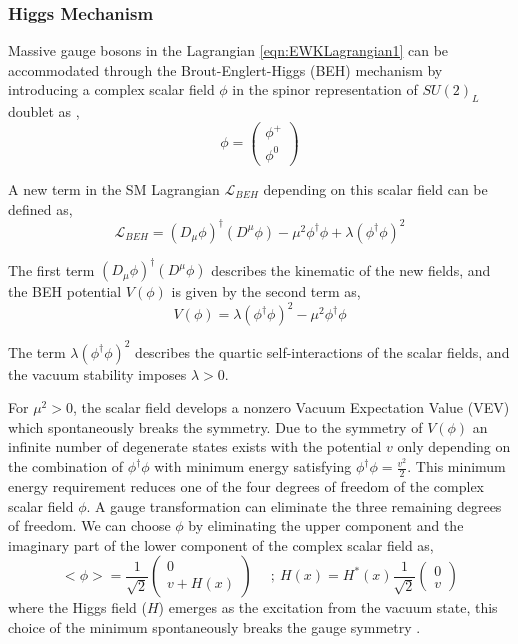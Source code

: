\subsubsection{Higgs Mechanism}
\label{subsubsec:HiggsMech}

Massive gauge bosons in the Lagrangian \ref{eqn:EWKLagrangian1} can be accommodated through the Brout-Englert-Higgs (BEH) mechanism by introducing a complex scalar field $\phi$ in the spinor representation of $SU(2)_{L}$ doublet as \cite{HiggsMechanism},
\begin{equation}
\phi = \begin{pmatrix} \phi^{+} \\ \phi^{0} \end{pmatrix}
\end{equation}

A new term in the SM Lagrangian $\mathcal{L}_{BEH}$ depending on this scalar field can be defined as, 
\begin{equation}
\mathcal{L}_{BEH}  = (D_{\mu} \phi)^{\dagger} ( D^{\mu} \phi) - \mu^2 \phi^{\dagger} \phi + \lambda (\phi^{\dagger} \phi)^2
\label{eqn:LagBEH}
\end{equation}

The first term $(D_{\mu} \phi)^{\dagger} ( D^{\mu} \phi)$ describes the kinematic of the new fields, and the BEH potential $V(\phi)$ is given by the second term as, 
\begin{equation}
V(\phi) = \lambda (\phi^{\dagger} \phi)^2 - \mu^2 \phi^{\dagger} \phi
\label{eqn:HiggsPot}
\end{equation}

The term $\lambda (\phi^{\dagger} \phi)^2$ describes the quartic self-interactions of the scalar fields, and the vacuum stability imposes $\lambda > 0 $. 

For $\mu^2 > 0$, the scalar field develops a nonzero Vacuum Expectation Value (VEV) which spontaneously breaks the symmetry. Due to the symmetry of $V(\phi)$ an infinite number of degenerate states exists with the potential $v$ only depending on the combination of $\phi^{\dagger}\phi$ 
\cite{PeskinQFT} with minimum energy satisfying $\phi^{\dagger}\phi = \frac{v^2}{2}$. This minimum energy requirement reduces one of the four degrees of freedom of the complex scalar field $\phi$. A gauge transformation can eliminate the three remaining degrees of freedom. We can choose $\phi$ by eliminating the upper component and the imaginary part of the lower component of the complex scalar field as,
\begin{equation}
<\phi> = \frac{1}{\sqrt{2}}\begin{pmatrix} 0 \\ v+H(x) \end{pmatrix}~ \hspace{10pt} ~;~ H(x) = H^{*}(x) 
 \frac{1}{\sqrt{2}} \begin{pmatrix} 0 \\ v \end{pmatrix}
\label{eqn:ScalarExp}
\end{equation}
where the Higgs field ($H$) emerges as the excitation from the vacuum state, this choice of the minimum spontaneously breaks the gauge symmetry \cite{DESYHiggsLecture}. 

